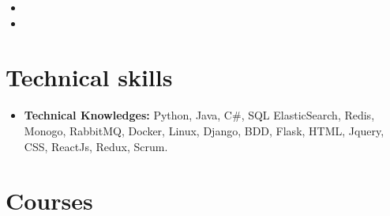 \documentclass[11pt,a4paper,sans]{moderncv}
\begin{document}
\vspace{5pt}

\begin{itemize}

\item{}

\item{}

\end{itemize}

\vspace{2pt}

\section{Technical skills}

\vspace{6pt}

\begin{itemize}

\item \textbf{Technical Knowledges:} Python, Java, C\#, SQL ElasticSearch, Redis, Monogo, RabbitMQ, Docker, Linux, Django, BDD, Flask, HTML, Jquery, CSS, ReactJs, Redux, Scrum.

\vspace{6pt}

\end{itemize}

\section{Courses}

\vspace{6pt}
\end{document}
